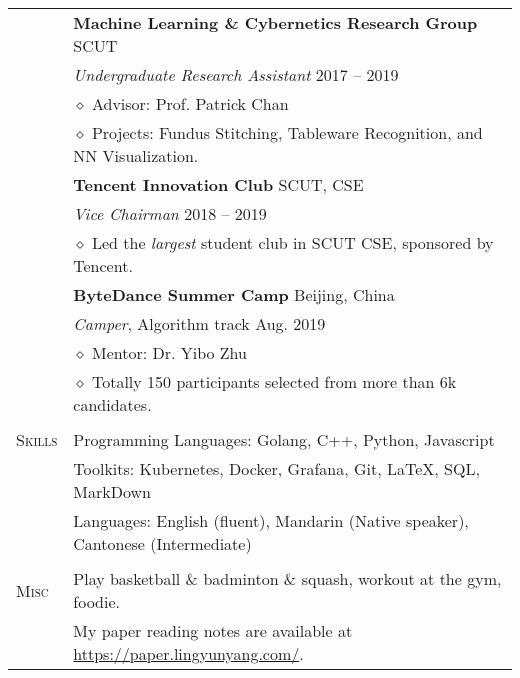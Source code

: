 \documentclass[letterpaper, 10pt]{article}
\begin{document}
\begin{longtable}{p{0.7in}p{6.0in}}
& \textbf{Machine Learning \& Cybernetics Research Group} \hfill SCUT \\
& \textit{Undergraduate Research Assistant} \hfill 2017 -- 2019 \\
& $\diamond$ Advisor: Prof. Patrick Chan \\
& $\diamond$ Projects: Fundus Stitching, Tableware Recognition, and NN Visualization. \\

& \textbf{Tencent Innovation Club} \hfill SCUT, CSE \\
& \textit{Vice Chairman} \hfill 2018 -- 2019 \\
& $\diamond$ Led the \textit{largest} student club in SCUT CSE, sponsored by Tencent. \\

& \textbf{ByteDance Summer Camp} \hfill Beijing, China \\
& \textit{Camper}, Algorithm track \hfill Aug. 2019 \\
& $\diamond$ Mentor: Dr. Yibo Zhu \\
& $\diamond$ Totally 150 participants selected from more than 6k candidates. \\


& \\

\nohyphens{\textsc{Skills}}
& Programming Languages: Golang, C++, Python, Javascript \\
& Toolkits: Kubernetes, Docker, Grafana, Git, \LaTeX, SQL, MarkDown \\
& Languages: English (fluent), Mandarin (Native speaker), Cantonese (Intermediate) \\
& \\


\nohyphens{\textsc{Misc}}
& Play basketball \& badminton \& squash, workout at the gym, foodie. \\
& My paper reading notes are available at \href{https://paper.lingyunyang.com/}{https://paper.lingyunyang.com/}. \\


\end{longtable}
\end{document}
